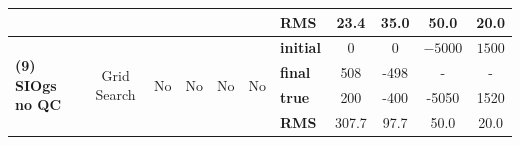 \documentclass[10pt,titlepage]{article}
\begin{document}
\begin{table}
{\begin{tabular}{l | c c c c c | l c c c c}
\multirow{4}{*}{} & \multirow{4}{*}{} & \multirow{4}{*}{} & \multirow{4}{*}{} & \multirow{4}{*}{} & \multirow{4}{*}{} & \textbf{RMS} & 23.4 & 35.0 & 50.0 & 20.0 \\ 
\hline
\multirow{4}{*}{\textbf{(9) SIOgs no QC}} & \multirow{4}{*}{Grid Search} & \multirow{4}{*}{No} & \multirow{4}{*}{No} & \multirow{4}{*}{No} & \multirow{4}{*}{No} & \textbf{initial} & 0 & 0 & $\mathit{-5000}$ & $\mathit{1500}$ \\ 
\multirow{4}{*}{} & \multirow{4}{*}{} & \multirow{4}{*}{} & \multirow{4}{*}{} & \multirow{4}{*}{} & \multirow{4}{*}{} & \textbf{final}& 508 & -498 & - & - \\ 
\multirow{4}{*}{} & \multirow{4}{*}{} & \multirow{4}{*}{} & \multirow{4}{*}{} & \multirow{4}{*}{} & \multirow{4}{*}{} & \textbf{true}& 200 & -400 & -5050 & 1520 \\ 
\multirow{4}{*}{} & \multirow{4}{*}{} & \multirow{4}{*}{} & \multirow{4}{*}{} & \multirow{4}{*}{} & \multirow{4}{*}{} & \textbf{RMS} & 307.7 & 97.7 & 50.0 & 20.0 \\ 
\hline
\end{tabular}
}
\label{table:compare_tool}
\end{table}
\end{document}
